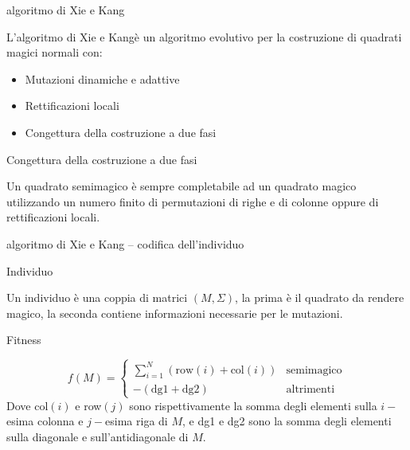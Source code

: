 \documentclass[10pt]{beamer}
\begin{document}
\begin{frame}{algoritmo di Xie e Kang}
			\parbox{0.98\columnwidth}{
			L'algoritmo di Xie e Kang\footnotemark[1] è un algoritmo evolutivo per la costruzione di quadrati magici normali con:
			\begin{itemize}
				\item Mutazioni dinamiche e adattive
				\item Rettificazioni locali
				\item Congettura della costruzione a due fasi
			\end{itemize}
		}

		\begin{alertblock}{Congettura della costruzione a due fasi}
		\parbox{0.98\columnwidth}{
Un quadrato semimagico è sempre completabile ad un quadrato magico utilizzando un numero finito di permutazioni di righe e di colonne oppure di rettificazioni locali.
		}
		\end{alertblock}
		
\end{frame}

\begin{frame}{algoritmo di Xie e Kang -- codifica dell'individuo}
    \begin{block}{Individuo}
    	\parbox{0.98\columnwidth}{
	    	Un individuo è una coppia di matrici $ (M,\Sigma) $, la prima è il quadrato da rendere magico, la seconda contiene informazioni necessarie per le mutazioni.
    	}
    \end{block}	
     \begin{block}{Fitness}
     	\parbox{0.98\columnwidth}{
			\[ f(M) = 
			\begin{cases}
			\sum_{i = 1}^{N}\left(\text{row}(i) + \text{col}(i) \right) & \text{semimagico} \\
			- \left(\text{dg1} + \text{dg2} \right) & \text{altrimenti} 
			\end{cases}
			\]
		Dove col$ (i) $ e row$ (j) $ sono rispettivamente la somma degli elementi sulla $ i- $esima colonna e $ j- $esima riga di $ M $, e dg1 e dg2 sono la somma degli elementi sulla diagonale e sull'antidiagonale di $ M $.
     	}
     \end{block}	
\end{frame}
\end{document}

